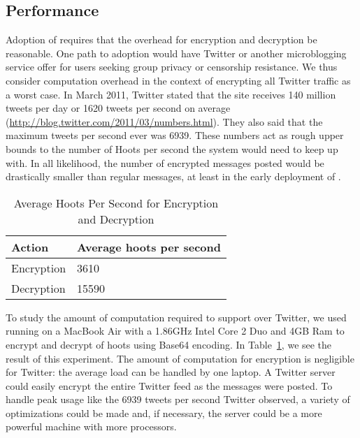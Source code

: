 \subsection{Performance}

Adoption of \hoot requires that the overhead for encryption and
decryption be reasonable. One path to adoption would have Twitter or
another microblogging service offer \hoot for users seeking group
privacy or censorship resistance. We thus consider computation overhead
in the context of encrypting all Twitter traffic as a worst case. In
March 2011, Twitter stated that the site receives 140 million tweets per
day or 1620 tweets per second on average
(\url{http://blog.twitter.com/2011/03/numbers.html}). They also said
that the maximum tweets per second ever was 6939. These numbers act as
rough upper bounds to the number of Hoots per second the system would
need to keep up with. In all likelihood, the number of encrypted
messages posted would be drastically smaller than regular messages, at
least in the early deployment of \hoot.

\begin{table}
\caption{Average Hoots Per Second for Encryption and Decryption
\label{tab:hps}
}
\begin{center}
    \begin{tabular}{ l  l }
	\hline
	Action & Average hoots per second \\ \hline
	Encryption & 3610 \\
	Decryption & 15590 \\ \hline
    \end{tabular}
\end{center}
\end{table}

To study the amount of computation required to support \hoot over
Twitter, we used  running on a MacBook
Air with a 1.86GHz Intel Core 2 Duo and 4GB Ram to encrypt and decrypt
 of hoots using Base64 encoding.
  In
Table~\ref{tab:hps}, we see the result of this experiment. The amount of
computation for encryption is negligible for Twitter: the average load
can be handled by one laptop. A Twitter server could easily encrypt the
entire Twitter feed as the messages were posted. To handle peak usage
like the 6939 tweets per second Twitter observed, a variety of
optimizations could be made and, if necessary, the server could be a
more powerful machine with more processors.

